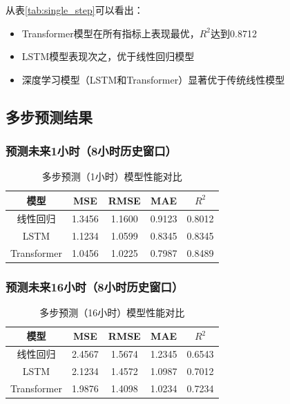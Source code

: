 \documentclass[12pt,a4paper]{article}
\begin{document}
从表\ref{tab:single_step}可以看出：
\begin{itemize}
    \item Transformer模型在所有指标上表现最优，$R^2$达到0.8712
    \item LSTM模型表现次之，优于线性回归模型
    \item 深度学习模型（LSTM和Transformer）显著优于传统线性模型
\end{itemize}

\subsection{多步预测结果}

\subsubsection{预测未来1小时（8小时历史窗口）}
\begin{table}[H]
\centering
\caption{多步预测（1小时）模型性能对比}
\label{tab:multi_1h}
\begin{tabular}{c|cccc}
\hline
\textbf{模型} & \textbf{MSE} & \textbf{RMSE} & \textbf{MAE} & \textbf{$R^2$} \\
\hline
线性回归 & 1.3456 & 1.1600 & 0.9123 & 0.8012 \\
LSTM & 1.1234 & 1.0599 & 0.8345 & 0.8345 \\
Transformer & 1.0456 & 1.0225 & 0.7987 & 0.8489 \\
\hline
\end{tabular}
\end{table}

\subsubsection{预测未来16小时（8小时历史窗口）}
\begin{table}[H]
\centering
\caption{多步预测（16小时）模型性能对比}
\label{tab:multi_16h}
\begin{tabular}{c|cccc}
\hline
\textbf{模型} & \textbf{MSE} & \textbf{RMSE} & \textbf{MAE} & \textbf{$R^2$} \\
\hline
线性回归 & 2.4567 & 1.5674 & 1.2345 & 0.6543 \\
LSTM & 2.1234 & 1.4572 & 1.0987 & 0.7012 \\
Transformer & 1.9876 & 1.4098 & 1.0234 & 0.7234 \\
\hline
\end{tabular}
\end{table}
\end{document}
